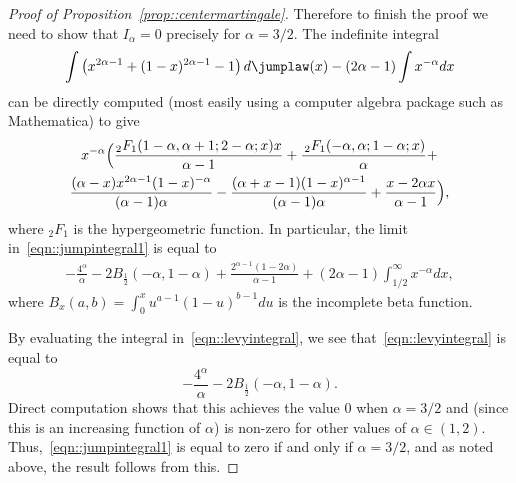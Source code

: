 \documentclass[JEP,XML,SOM,Unicode]{cedram}
\theoremstyle{plain}
\numberwithin{theorem}{section}
\theoremstyle{definition}
\begin{document}
\begin{proof}[Proof of Proposition~\ref{prop::centermartingale}]
Therefore to finish the proof we need to show that $I_\alpha = 0$ precisely for $\alpha=3/2$. The indefinite integral
\begin{equation}
\label{eqn::jumpintegral2}
\int \left( x^{2\alpha - 1} + (1-x)^{2\alpha -1} - 1 \right) d\jumplaw(x) - (2\alpha - 1) \int x^{-\alpha} dx
\end{equation}
can be directly computed (most easily using a computer algebra package such as Mathematica) to give
\begin{multline*}
x^{-\alpha} \Bigl(\frac{_2F_1(1-\alpha,\alpha+1;2-\alpha;x) x }{\alpha-1}+\frac{\,
_2F_1(-\alpha,\alpha;1-\alpha;x)}{\alpha}+\\
\frac{(\alpha-x) x^{2 \alpha-1} (1-x)^{-\alpha}}{(\alpha-1) \alpha}-\frac{(\alpha+x-1)
(1-x)^{\alpha-1}}{(\alpha-1) \alpha}+ \frac{x-2 \alpha x}{\alpha-1} \Bigr),
\end{multline*}
where $_2F_1$ is the hypergeometric function. In particular, the limit in~\eqref{eqn::jumpintegral1} is equal to
\begin{align}
\label{eqn::levyintegral}
-\frac{4^\alpha}{\alpha} - 2 B_{\frac{1}{2}}(-\alpha,1-\alpha) + \frac{2^{\alpha-1} (1-2 \alpha)}{\alpha-1} + (2\alpha - 1) \int_{1/2}^\infty x^{-\alpha } dx,
\end{align}
where $B_{x}(a,b) = \int_0^x u^{a-1}(1-u)^{b-1} du$ is the incomplete beta function.

By evaluating the integral in~\eqref{eqn::levyintegral}, we see that~\eqref{eqn::levyintegral} is equal to
\[
-\frac{4^\alpha}{\alpha} - 2 B_{\frac{1}{2}}(-\alpha,1-\alpha).
\]
Direct computation shows that this achieves the value $0$ when $\alpha = 3/2$ and (since this is an increasing function of $\alpha$) is non-zero for other values of $\alpha \in (1,2)$. Thus,~\eqref{eqn::jumpintegral1} is equal to zero if and only if $\alpha = 3/2$, and as noted above, the result follows from this.
\end{proof}




\end{document}
